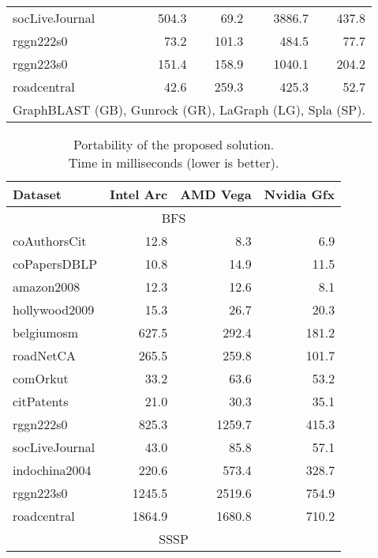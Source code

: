 \begin{table}[tbp]
\begin{center}
\begin{tabular}{|l|r|r|r|r|}
    \rowcolor{black!10} socLiveJournal&504.3&69.2&3886.7&437.8\\
    \rowcolor{black!2 } rggn222s0&73.2&101.3&484.5&77.7\\
    \rowcolor{black!10} rggn223s0&151.4&158.9&1040.1&204.2\\
    \rowcolor{black!2 } roadcentral&42.6&259.3&425.3&52.7\\
    \hline
    \hline
    \multicolumn{5}{l}{GraphBLAST (GB), Gunrock (GR), LaGraph (LG), Spla (SP).} \\
    \end{tabular}
    \label{rq1_table}
\end{center}
\end{table}

\begin{table}[tbp]
\caption{Portability of the proposed solution.\\Time in milliseconds (lower is better).} 
\begin{center}
    \begin{tabular}{|l|r|r|r|}
    \hline
    Dataset & Intel Arc & AMD Vega & Nvidia Gfx\\
    \hline
    \hline
    \multicolumn{4}{|c|}{BFS} \\
    \hline
    \rowcolor{black!10} coAuthorsCit&12.8&8.3&6.9\\
    \rowcolor{black!2 } coPapersDBLP&10.8&14.9&11.5\\
    \rowcolor{black!10} amazon2008&12.3&12.6&8.1\\
    \rowcolor{black!2 } hollywood2009&15.3&26.7&20.3\\
    \rowcolor{black!10} belgiumosm&627.5&292.4&181.2\\
    \rowcolor{black!2 } roadNetCA&265.5&259.8&101.7\\
    \rowcolor{black!10} comOrkut&33.2&63.6&53.2\\
    \rowcolor{black!2 } citPatents&21.0&30.3&35.1\\
    \rowcolor{black!10} rggn222s0&825.3&1259.7&415.3\\
    \rowcolor{black!2 } socLiveJournal&43.0&85.8&57.1\\
    \rowcolor{black!10} indochina2004&220.6&573.4&328.7\\
    \rowcolor{black!2 } rggn223s0&1245.5&2519.6&754.9\\
    \rowcolor{black!10} roadcentral&1864.9&1680.8&710.2\\
    \hline
    \hline
    \multicolumn{4}{|c|}{SSSP} \\

\end{tabular}
\end{center}
\end{table}
